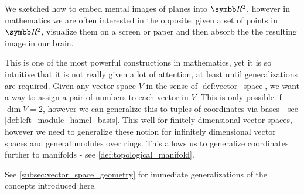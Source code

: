 \begin{remark}\label{remark:coordinate_systems}
  We sketched how to embed mental images of planes into \( \R^2 \), however in mathematics we are often interested in the opposite: given a set of points in \( \R^2 \), visualize them on a screen or paper and then absorb the the resulting image in our brain.

  This is one of the most powerful constructions in mathematics, yet it is so intuitive that it is not really given a lot of attention, at least until generalizations are required. Given any vector space \( V \) in the sense of \cref{def:vector_space}, we want a way to assign a pair of numbers to each vector in \( V \). This is only possible if \( \dim V = 2 \), however we can generalize this to tuples of coordinates via bases - see \cref{def:left_module_hamel_basis}. This well for finitely dimensional vector spaces, however we need to generalize these notion for infinitely dimensional vector spaces and general modules over rings. This allows us to generalize coordinates further to manifolds - see \cref{def:topological_manifold}.

  See \cref{subsec:vector_space_geometry} for immediate generalizations of the concepts introduced here.
\end{remark}
